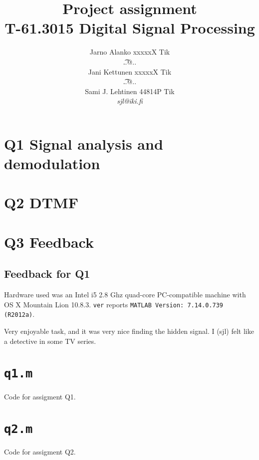 \documentclass[a4paper]{article}
\begin{document}
\title{Project assignment \\
T-61.3015 Digital Signal Processing}
\author{Jarno Alanko xxxxxX Tik \\
  {\t ..@..} \\
  Jani Kettunen xxxxxX Tik \\
  {\t ..@..} \\
  Sami J. Lehtinen 44814P Tik \\ 
       {\it sjl@iki.fi}}

\maketitle             
\thispagestyle{empty}
\newpage
{}
\setcounter{page}{2}

\section*{Q1 Signal analysis and demodulation }


\section*{Q2 DTMF}


\section*{Q3 Feedback}
\subsection{Feedback for Q1}
Hardware used was an Intel i5 2.8 Ghz quad-core PC-compatible machine
with OS X Mountain Lion 10.8.3.  {\tt ver} reports 
{\tt MATLAB Version: 7.14.0.739 (R2012a)}.

Very enjoyable task, and it was very nice finding the hidden signal.  I
(sjl) felt like a detective in some TV series.

\clearpage




\newpage
\appendix
\section{{\tt q1.m}}
\label{sect:q1m}
Code for assigment Q1.



\newpage
\section{{\tt q2.m}}
\label{sect:q2m}
Code for assigment Q2.


\end{document}
